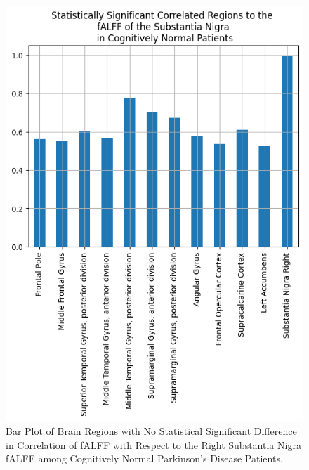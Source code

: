 \documentclass[12pt]{article}
\begin{document}
\begin{figure}[h]  %
    \centering
    \includegraphics[width=\textwidth]{"../img/statistically_significant_correlated_regions_sn_cogn.png"}  %
    \caption{Bar Plot of Brain Regions with No Statistical Significant Difference in Correlation of fALFF with Respect to the Right Substantia Nigra fALFF among Cognitively Normal Parkinson's Disease Patients.}
    \label{fig:cn}  %
\end{figure}

\FloatBarrier
\end{document}

